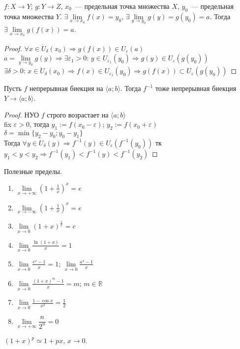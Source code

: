 \documentclass[12pt]{article}
\begin{document}
	\begin{theorem}
		$f: X \rightarrow Y$; $g: Y \rightarrow Z$, $x_0$~--- предельная точка множества $X$, $y_0$~--- предельная точка множества $Y$. $\exists \lim \limits_{x \rightarrow x_0} f(x) = y_0$, $\exists \lim \limits_{y \rightarrow y_0} g(y) = g(y_0) = a$. Тогда $\exists \lim \limits_{x \rightarrow x_0} g(f(x)) = a$.
	\end{theorem}
	\begin{proof}
		$\forall x \in \mathring{U}_{\delta}(x_0) \Rightarrow g(f(x)) \in U_{\varepsilon} (a)$ \\
		$a = \lim \limits_{y \rightarrow y_0} g(y) \Rightarrow \exists \varepsilon_1 > 0$: $y \in U_{\varepsilon_1} (y_0) \Rightarrow g(y) \in U_{\varepsilon} (g(y_0))$ \\
		$\exists \delta > 0$: $x \in \mathring{U}_{\delta} (x_0) \Rightarrow f(x) \in U_{\varepsilon_1} (y_0) \Rightarrow g(f(x)) \subset U_{\varepsilon} (g(y_0))$
	\end{proof}
	\begin{theorem}
		Пусть $f$ непрерывная биекция на $\langle a; b \rangle$. Тогда $f^{-1}$ тоже непрерывная биекция $Y \rightarrow \langle a; b \rangle$.
	\end{theorem}
	\begin{proof}
		НУО $f$ строго возрастает на $\langle a; b \rangle$ \\
		fix $\varepsilon > 0$, тогда $y_1 := f(x_0 - \varepsilon)$; $y_2 := f(x_0 + \varepsilon)$ \\
		$\delta = \min \{ y_2 - y_0; y_0 - y_1 \}$ \\
		Тогда $\forall y \in U_{\delta} (y) \Rightarrow f^{-1} (y) \in U_{\epsilon} (f^{-1} (y_0))$ тк $y_1 < y < y_2 \Rightarrow f^{-1} (y_1) < f^{-1} (y) < f^{-1} (y_2)$
	\end{proof}
	\begin{statement}
		Полезные пределы.
		\begin{enumerate}
			\item $\lim\limits_{x \rightarrow +\infty} (1 + \frac{1}{x})^x = e$
			\item $\lim\limits_{x \rightarrow -\infty} (1 + \frac{1}{x})^x = e$
			\item $\lim\limits_{x \rightarrow 0} (1 + x)^{\frac{1}{x}} = e$
			\item $\lim\limits_{x \rightarrow 0} \frac{\ln (1 + x)}{x} = 1$
			\item $\lim\limits_{x \rightarrow 0} \frac{e^x - 1}{x} = 1$; $\lim\limits_{x \rightarrow 0} \frac{a^x - 1}{x}$
			\item $\lim\limits_{x \rightarrow 0} \frac{(1 + x)^m - 1}{x} = m$; $m \in \mathbb{R}$
			\item $\lim\limits_{x \rightarrow 0} \frac{1 - \cos x}{x^2} = \frac{1}{2}$
			\item $\lim\limits_{x \rightarrow +\infty} \dfrac{n}{2^n} = 0$
		\end{enumerate}
	\end{statement}
	\begin{statement}
		$(1 + x)^p \simeq 1 + px$, $x \rightarrow 0$.
	\end{statement}
\end{document}
